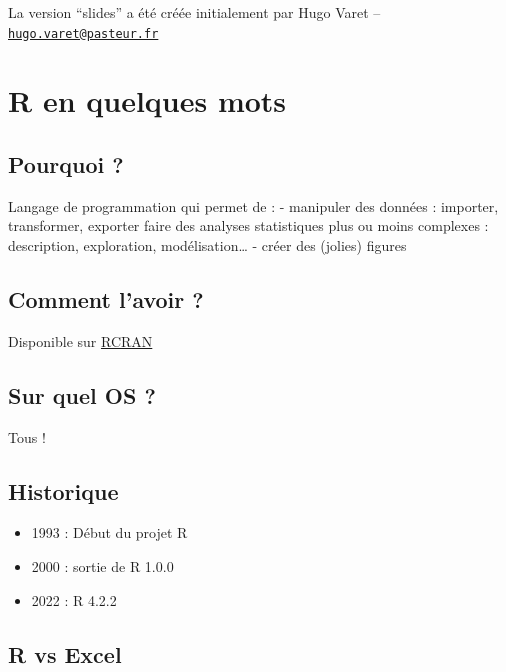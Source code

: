 \documentclass[
]{book}
\providecommand{\tightlist}{%
  \setlength{\itemsep}{0pt}\setlength{\parskip}{0pt}}
\begin{document}
La version ``slides'' a été créée initialement par Hugo Varet -- \href{mailto:hugo.varet@pasteur.fr}{\nolinkurl{hugo.varet@pasteur.fr}}

\hypertarget{r-en-quelques-mots}{%
\chapter{R en quelques mots}\label{r-en-quelques-mots}}

\hypertarget{pourquoi}{%
\section{Pourquoi ?}\label{pourquoi}}

Langage de programmation qui permet de :
- manipuler des données : importer, transformer, exporter faire des analyses statistiques plus ou moins complexes : description, exploration, modélisation\ldots{}
- créer des (jolies) figures

\hypertarget{comment-lavoir}{%
\section{Comment l'avoir ?}\label{comment-lavoir}}

Disponible sur \href{https://cran.r-project.org/}{RCRAN}

\hypertarget{sur-quel-os}{%
\section{Sur quel OS ?}\label{sur-quel-os}}

Tous !

\hypertarget{historique}{%
\section{Historique}\label{historique}}

\begin{itemize}
\tightlist
\item
  1993 : Début du projet R
\item
  2000 : sortie de R 1.0.0
\item
  2022 : R 4.2.2
\end{itemize}

\hypertarget{r-vs-excel}{%
\section{R vs Excel}\label{r-vs-excel}}
\end{document}
